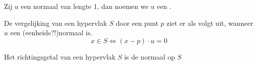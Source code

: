 \documentclass[main.tex]{subfiles}
\begin{document}
\begin{de}
  Zij $u$ een normaal van lengte $1$, dan noemen we $u$ een .
\end{de}

\begin{st}
  De vergelijking van een hypervlak $S$ door een punt $p$ ziet er als volgt uit, wanneer $u$ een (eenheids?!)normaal is.
  \[ x \in S \Leftrightarrow (x-p) \cdot u = 0 \]
\end{st}

\begin{gev}
  Het richtingsgetal van een hypervlak $S$ is de normaal op $S$
\end{gev}
\end{document}
